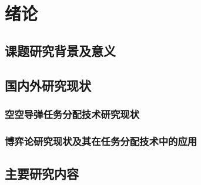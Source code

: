 
\chapter{绪论}
\label{chap:intro}

\section{课题研究背景及意义}
\label{intro:sec:bg}

\section{国内外研究现状}
\label{intro:sec:related}

\subsection{空空导弹任务分配技术研究现状}
\label{rw:sub:ta}

\subsection{博弈论研究现状及其在任务分配技术中的应用}
\label{rw:sub:game}

\section{主要研究内容}
\label{mainwork}